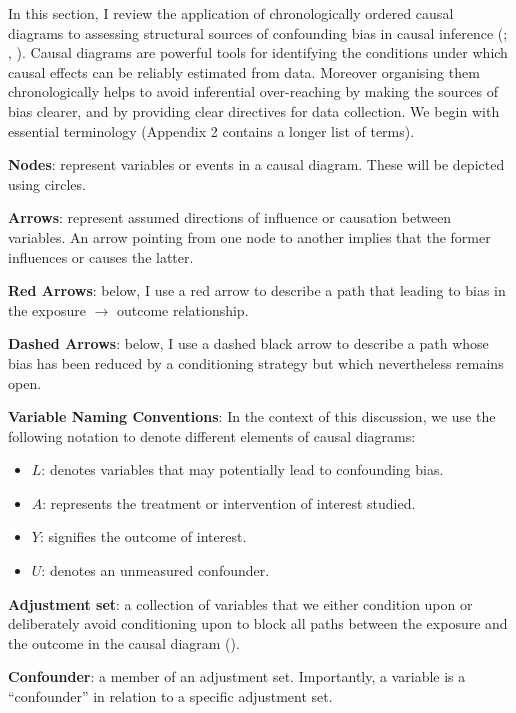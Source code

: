 \documentclass[
  singlecolumn,
  9pt]{article}
\providecommand{\tightlist}{%
  \setlength{\itemsep}{0pt}\setlength{\parskip}{0pt}}\usepackage{longtable,booktabs,array}
\begin{document}
In this section, I review the application of chronologically ordered
causal diagrams to assessing structural sources of confounding bias in
causal inference (; ,
). Causal diagrams are powerful tools for
identifying the conditions under which causal effects can be reliably
estimated from data. Moreover organising them chronologically helps to
avoid inferential over-reaching by making the sources of bias clearer,
and by providing clear directives for data collection. We begin with
essential terminology (Appendix 2 contains a longer list of terms).

\textbf{Nodes}: represent variables or events in a causal diagram. These
will be depicted using circles.

\textbf{Arrows}: represent assumed directions of influence or causation
between variables. An arrow pointing from one node to another implies
that the former influences or causes the latter.

\textbf{Red Arrows}: below, I use a red arrow to describe a path that
leading to bias in the exposure \(\to\) outcome relationship.

\textbf{Dashed Arrows}: below, I use a dashed black arrow to describe a
path whose bias has been reduced by a conditioning strategy but which
nevertheless remains open.

\textbf{Variable Naming Conventions}: In the context of this discussion,
we use the following notation to denote different elements of causal
diagrams:

\begin{itemize}
\tightlist
\item
  \(L\): denotes variables that may potentially lead to confounding
  bias.
\item
  \(A\): represents the treatment or intervention of interest studied.
\item
  \(Y\): signifies the outcome of interest.
\item
  \(U\): denotes an unmeasured confounder.
\end{itemize}

\textbf{Adjustment set}: a collection of variables that we either
condition upon or deliberately avoid conditioning upon to block all
paths between the exposure and the outcome in the causal diagram
().

\textbf{Confounder}: a member of an adjustment set. Importantly, a
variable is a ``confounder'' in relation to a specific adjustment set.
\end{document}
